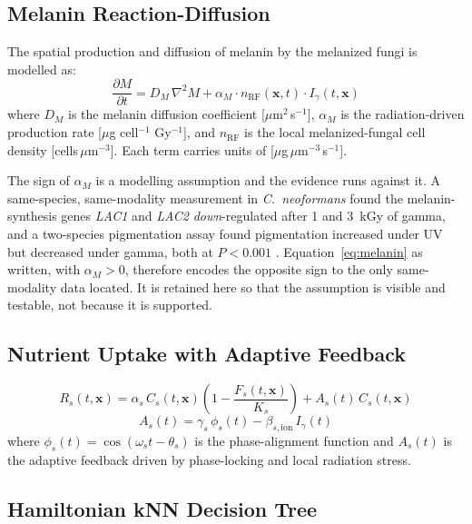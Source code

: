 \documentclass[11pt]{article}
\begin{document}
\subsection{Melanin Reaction-Diffusion}

The spatial production and diffusion of melanin by the melanized fungi is modelled as:
\begin{equation}
\label{eq:melanin}
\frac{\partial M}{\partial t} = D_M\,\nabla^2 M + \alpha_M\cdot n_{\mathrm{RF}}(\mathbf{x},t)\cdot I_\gamma(t,\mathbf{x})
\end{equation}
where $D_M$ is the melanin diffusion coefficient [$\mu$m$^2$\,s$^{-1}$], $\alpha_M$ is the
radiation-driven production rate [$\mu$g cell$^{-1}$ Gy$^{-1}$], and $n_{\mathrm{RF}}$ is the
local melanized-fungal cell density [cells\,$\mu$m$^{-3}$]. Each term carries units of
[$\mu$g\,$\mu$m$^{-3}$\,s$^{-1}$].

The sign of $\alpha_M$ is a modelling assumption and the evidence runs against it. A same-species,
same-modality measurement in \textit{C.\ neoformans} found the melanin-synthesis genes \textit{LAC1}
and \textit{LAC2} \emph{down}-regulated after 1 and 3~kGy of gamma, and a two-species pigmentation
assay found pigmentation increased under UV but decreased under gamma, both at $P < 0.001$
\cite{audit2026}. Equation~\ref{eq:melanin} as written, with $\alpha_M > 0$, therefore encodes the
opposite sign to the only same-modality data located. It is retained here so that the assumption is
visible and testable, not because it is supported.

\subsection{Nutrient Uptake with Adaptive Feedback}
\label{sec:nutrient}

\begin{equation}
\label{eq:nutrient}
R_s(t,\mathbf{x}) = \alpha_s\,C_s(t,\mathbf{x})\!\left(1 - \frac{F_s(t,\mathbf{x})}{K_s}\right)
  + A_s(t)\,C_s(t,\mathbf{x})
\end{equation}
\begin{equation}
\label{eq:adaptive}
A_s(t) = \gamma_s\,\phi_s(t) - \beta_{s,\mathrm{ion}}\,I_\gamma(t)
\end{equation}
where $\phi_s(t) = \cos(\omega_s t - \theta_s)$ is the phase-alignment function and $A_s(t)$ is
the adaptive feedback driven by phase-locking and local radiation stress.

\subsection{Hamiltonian kNN Decision Tree}
\end{document}
